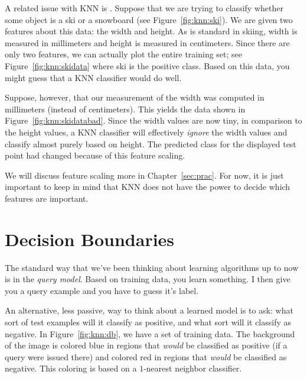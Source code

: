 

A related issue with KNN is .  Suppose that we
are trying to classify whether some object is a ski or a snowboard
(see Figure~\ref{fig:knn:ski}).  We are given two features about this
data: the width and height.  As is standard in skiing, width is
measured in millimeters and height is measured in centimeters.  Since
there are only two features, we can actually plot the entire training
set; see Figure~\ref{fig:knn:skidata} where ski is the positive class.
Based on this data, you might guess that a KNN classifier would do
well.


Suppose, however, that our measurement of the width was computed in
millimeters (instead of centimeters).  This yields the data shown in
Figure~\ref{fig:knn:skidatabad}.  Since the width values are now tiny,
in comparison to the height values, a KNN classifier will effectively
\emph{ignore} the width values and classify almost purely based on
height.  The predicted class for the displayed test point had changed
because of this feature scaling.

We will discuss feature scaling more in Chapter~\ref{sec:prac}.  For
now, it is just important to keep in mind that KNN does not have the
power to decide which features are important.

\section{Decision Boundaries}

The standard way that we've been thinking about learning algorithms up
to now is in the \emph{query model}.  Based on training data, you
learn something.  I then give you a query example and you have to
guess it's label.


An alternative, less passive, way to think about a learned model is to
ask: what sort of test examples will it classify as positive, and what
sort will it classify as negative.  In Figure~\ref{fig:knn:db}, we have a
set of training data.  The background of the image is colored blue in
regions that \emph{would} be classified as positive (if a query were
issued there) and colored red in regions that \emph{would} be
classified as negative.  This coloring is based on a $1$-nearest
neighbor classifier.

